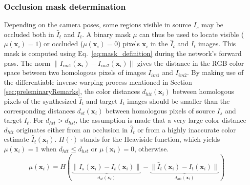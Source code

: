 \documentclass[a4paper,fleqn]{cas-dc}
\begin{document}
\subsubsection{Occlusion mask determination}
%
Depending on the camera poses, some regions visible in source $I_s$ may be occluded both in $\hat{I}_t$ and $I_t$. A binary mask $\mu$ can thus be used to locate 
visible ($\mu(\mathbf{x}_i) = 1$) or occluded ($\mu(\mathbf{x}_i) = 0$) pixels $\mathbf{x}_i$ in the $\hat{I}_t$ and $I_t$ images.
%
This mask is computed using Eq.~\eqref{eq:mask_definition} during the network's forward pass. The norm $\left\|I_{im1}(\mathbf{x}_i) - I_{im2}(\mathbf{x}_i)\right\|$ gives the distance in the RGB-color space between two homo\-lo\-gous pixels of images $I_{im1}$ and $I_{im2}$. By making use of the differentiable inverse warping process mentioned in Section \ref{sec:preleminaryRemarks}, the color distances $d_{htt}(\mathbf{x}_i)$ between homologous pixels of the synthesized  $\hat{I}_t$ and target $I_t$ images should be smaller than the corresponding distances $d_{st}(\mathbf{x}_i)$ between homologous pixels of source $I_s$ and target $I_t$. For $d_{htt} > d_{hst}$, the assumption is made that a very large color distance $d_{htt}$ originates either from an occlusion in $\hat{I}_t$ or from a highly inaccurate color estimate $\hat{I}_{t}(\mathbf{x}_i)$. $H(\cdot)$ stands for the Heaviside function, which yields  $\mu(\mathbf{x}_i) = 1$ when $d_{htt} \leq d_{hst}$ or $\mu(\mathbf{x}_i) = 0$, otherwise.
%
\begin{equation} \label{eq:mask_definition} 
\mu(\mathbf{x}_i) =  H (\underbrace{\|I_s(\mathbf{x}_i) - I_t(\mathbf{x}_i)\|}_{d_{st}(\mathbf{x}_i)} - \underbrace{\|\hat{I}_t(\mathbf{x}_i) - I_t(\mathbf{x}_i)\|}_{d_{htt}(\mathbf{x}_i)})
\end{equation} 
%
%
\end{document}
